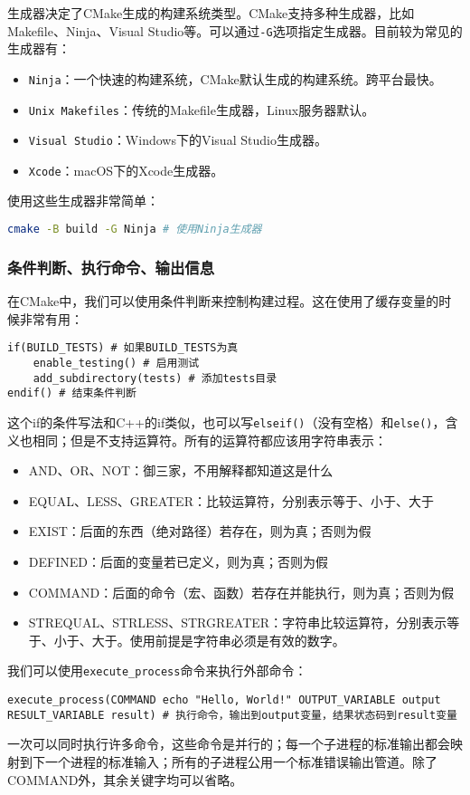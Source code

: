 \documentclass[../main.tex]{subfiles}
\begin{document}
生成器决定了CMake生成的构建系统类型。CMake支持多种生成器，比如Makefile、Ninja、Visual Studio等。可以通过\texttt{-G}选项指定生成器。目前较为常见的生成器有：

\begin{itemize}
    \item \texttt{Ninja}：一个快速的构建系统，CMake默认生成的构建系统。跨平台最快。
    \item \texttt{Unix Makefiles}：传统的Makefile生成器，Linux服务器默认。
    \item \texttt{Visual Studio}：Windows下的Visual Studio生成器。
    \item \texttt{Xcode}：macOS下的Xcode生成器。
\end{itemize}
使用这些生成器非常简单：
\begin{lstlisting}[language=bash]
cmake -B build -G Ninja # 使用Ninja生成器
\end{lstlisting}

\subsubsection{条件判断、执行命令、输出信息}

在CMake中，我们可以使用条件判断来控制构建过程。这在使用了缓存变量的时候非常有用：
\begin{lstlisting}
if(BUILD_TESTS) # 如果BUILD_TESTS为真
    enable_testing() # 启用测试
    add_subdirectory(tests) # 添加tests目录
endif() # 结束条件判断
\end{lstlisting}

这个if的条件写法和C++的if类似，也可以写\texttt{elseif()}（没有空格）和\texttt{else()}，含义也相同；但是不支持运算符。所有的运算符都应该用字符串表示：
\begin{itemize}
    \item AND、OR、NOT：御三家，不用解释都知道这是什么
    \item EQUAL、LESS、GREATER：比较运算符，分别表示等于、小于、大于
    \item EXIST：后面的东西（绝对路径）若存在，则为真；否则为假
    \item DEFINED：后面的变量若已定义，则为真；否则为假
    \item COMMAND：后面的命令（宏、函数）若存在并能执行，则为真；否则为假
    \item STREQUAL、STRLESS、STRGREATER：字符串比较运算符，分别表示等于、小于、大于。使用前提是字符串必须是有效的数字。
\end{itemize}

我们可以使用\texttt{execute\_process}命令来执行外部命令：
\begin{lstlisting}
execute_process(COMMAND echo "Hello, World!" OUTPUT_VARIABLE output RESULT_VARIABLE result) # 执行命令，输出到output变量，结果状态码到result变量
\end{lstlisting}
一次可以同时执行许多命令，这些命令是并行的；每一个子进程的标准输出都会映射到下一个进程的标准输入；所有的子进程公用一个标准错误输出管道。除了COMMAND外，其余关键字均可以省略。
\end{document}
